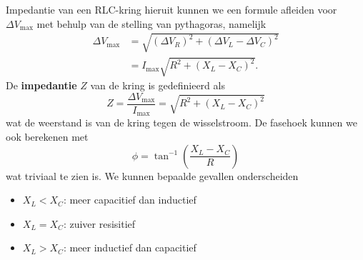 \begin{theo}{Impedantie van een RLC-kring}
    \vspace{0.5cm}
    \noindent hieruit kunnen we een formule afleiden voor $\Delta V_{\max}$ met behulp van de stelling van pythagoras, namelijk
    \begin{align*}
        \Delta V_{\max} &= \sqrt{(\Delta V_{R})^2 + (\Delta V_{L} - \Delta V_{C})^2} \\
                        &= I_{\max}\sqrt{R^2 + (X_{L} - X_{C})^2}.
    \end{align*}
    De \textbf{impedantie} $Z$ van de kring is gedefinieerd als
    \begin{equation*}
        Z = \dfrac{\Delta V_{\max}}{I_{\max}} = \sqrt{R^2 + (X_{L} - X_{C})^2}
    \end{equation*}
    wat de weerstand is van de kring tegen de wisselstroom. De fasehoek kunnen we ook berekenen met
    \begin{equation*}
        \phi = \tan^{-1}\left(\frac{X_L - X_C}{R}\right)
    \end{equation*} 
    wat triviaal te zien is. We kunnen bepaalde gevallen onderscheiden
    \begin{itemize}
        \item $X_{L} < X_{C}$: meer capacitief dan inductief 
        \item $X_{L} = X_{C}$: zuiver resisitief
        \item $X_{L} > X_{C}$: meer inductief dan capacitief
    \end{itemize}
\end{theo}

\newpage



